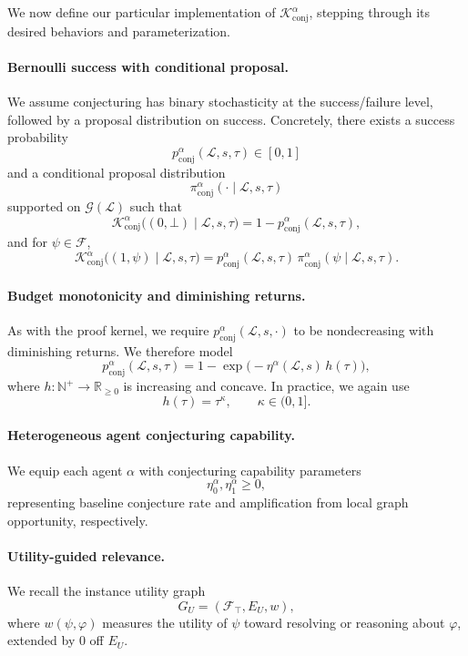 \documentclass[letterpaper]{article} %
\renewcommand{\phi}{\varphi}
\begin{document}
We now define our particular implementation of $\mathcal K^\alpha_{\mathrm{conj}}$, stepping through its desired behaviors and parameterization.

\paragraph{Bernoulli success with conditional proposal.}
We assume conjecturing has binary stochasticity at the success/failure level, followed by a proposal distribution on success. Concretely, there exists a success probability
\[
p^\alpha_{\mathrm{conj}}(\mathcal L,s,\tau)\in[0,1]
\]
and a conditional proposal distribution
\[
\pi^\alpha_{\mathrm{conj}}(\cdot\mid \mathcal L,s,\tau)
\]
supported on $\mathcal G(\mathcal L)$ such that
\[
\mathcal K^\alpha_{\mathrm{conj}}\big((0,\bot)\mid \mathcal L,s,\tau\big)
=
1-p^\alpha_{\mathrm{conj}}(\mathcal L,s,\tau),
\]
and for $\psi\in\mathcal F$,
\[
\mathcal K^\alpha_{\mathrm{conj}}\big((1,\psi)\mid \mathcal L,s,\tau\big)
=
p^\alpha_{\mathrm{conj}}(\mathcal L,s,\tau)\,\pi^\alpha_{\mathrm{conj}}(\psi\mid \mathcal L,s,\tau).
\]

\paragraph{Budget monotonicity and diminishing returns.}
As with the proof kernel, we require $p^\alpha_{\mathrm{conj}}(\mathcal L,s,\cdot)$ to be nondecreasing with diminishing returns. We therefore model
\[
p^\alpha_{\mathrm{conj}}(\mathcal L,s,\tau)
=
1-\exp\!\big(-\eta^\alpha(\mathcal L,s)\,h(\tau)\big),
\]
where $h:\mathbb N^+\to\mathbb R_{\ge 0}$ is increasing and concave. In practice, we again use
\[
h(\tau)=\tau^\kappa,\qquad \kappa\in(0,1].
\]

\paragraph{Heterogeneous agent conjecturing capability.}
We equip each agent $\alpha$ with conjecturing capability parameters
\[
\eta_0^\alpha,\eta_1^\alpha\ge 0,
\]
representing baseline conjecture rate and amplification from local graph opportunity, respectively.

\paragraph{Utility-guided relevance.}
We recall the instance utility graph
\[
G_U=(\mathcal F_\top,E_U,w),
\]
where $w(\psi,\phi)$ measures the utility of $\psi$ toward resolving or reasoning about $\phi$, extended by $0$ off $E_U$.
\end{document}
